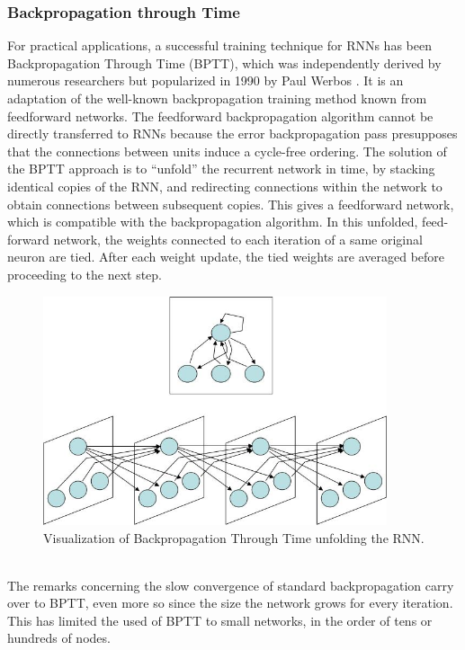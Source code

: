 \documentclass[12pt,oneside]{CUNY_CS_PhD}
\begin{document}
\subsubsection{Backpropagation through Time}
For practical applications, a successful training technique for RNNs has been Backpropagation Through Time (BPTT), which was independently derived by numerous researchers but popularized in 1990 by Paul Werbos \cite{werbos_backpropagation_1990}. It is an adaptation of the well-known backpropagation training method known from feedforward networks. The feedforward backpropagation algorithm cannot be directly transferred to RNNs because the error backpropagation pass presupposes that the connections between units induce a cycle-free ordering. The solution of the BPTT approach is to ``unfold'' the recurrent network in time, by stacking identical copies of the RNN, and redirecting connections within the network to obtain connections between subsequent copies. This gives a feedforward network, which is compatible with the backpropagation algorithm. In this unfolded, feed-forward network, the weights connected to each iteration of a same original neuron are tied. After each weight update, the tied weights are averaged before proceeding to the next step.
\begin{figure}[!htbp]
\centering
\includegraphics[width=0.9\textwidth]{pictures/bptt-influence.png}
\caption{Visualization of Backpropagation Through Time unfolding the RNN.}
\label{fig:bptt}
\end{figure}\\
The remarks concerning the slow convergence of standard backpropagation carry over to BPTT, even more so since the size the network grows for every iteration. This has limited the used of BPTT to small networks, in the order of tens or hundreds of nodes.\\
\end{document}
